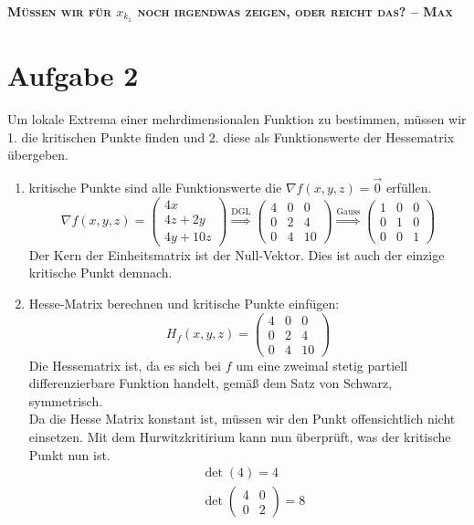 \documentclass[10pt,a4paper,parskip=half]{scrartcl}
\begin{document}
\textbf{\textsc{Müssen wir für $x_{k_1}$ noch irgendwas zeigen, oder reicht das? -- Max}}

\section*{Aufgabe 2}
Um lokale Extrema einer mehrdimensionalen Funktion zu bestimmen, müssen wir 1. die kritischen Punkte finden und 2. diese als Funktionswerte der Hessematrix übergeben.
\begin{enumerate}
	\item kritische Punkte sind alle Funktionswerte die $\nabla f(x,y,z) = \vec0$ erfüllen.
	\[\nabla f(x,y,z) = 
	\begin{pmatrix}
		4x \\ 
		4z + 2y \\
		4y + 10z	
	\end{pmatrix} \overset{\text{DGL}}{\Rightarrow}
	\begin{pmatrix}
		4 & 0 & 0 \\
		0 & 2 & 4 \\
		0 & 4 & 10 
	\end{pmatrix} \overset{\text{Gauss}}{\Rightarrow}
	\begin{pmatrix}
		1 & 0 & 0 \\
		0 & 1 & 0 \\
		0 & 0 & 1
	\end{pmatrix}\]
	Der Kern der Einheitsmatrix ist der Null-Vektor. Dies ist auch der einzige kritische Punkt demnach.
	\item Hesse-Matrix berechnen und kritische Punkte einfügen:
	\[H_f(x,y,z) =
	\begin{pmatrix}
		4 & 0 & 0 \\
		0 & 2 & 4 \\
		0 & 4 & 10
	\end{pmatrix}
	\] 
	Die Hessematrix ist, da es sich bei $f$ um eine zweimal stetig partiell differenzierbare Funktion handelt, gemäß dem Satz von Schwarz, symmetrisch.\\
	Da die Hesse Matrix konstant ist, müssen wir den Punkt offensichtlich nicht einsetzen. Mit dem Hurwitzkritirium kann nun überprüft, was der kritische Punkt nun ist. 
	\begin{align*}
	 	&\det(4) = 4 \\
	 	&\det \begin{pmatrix}
	 		4 & 0 \\
	 		0 & 2	
	 	\end{pmatrix} = 8 \\

\end{align*}
\end{enumerate}
\end{document}
